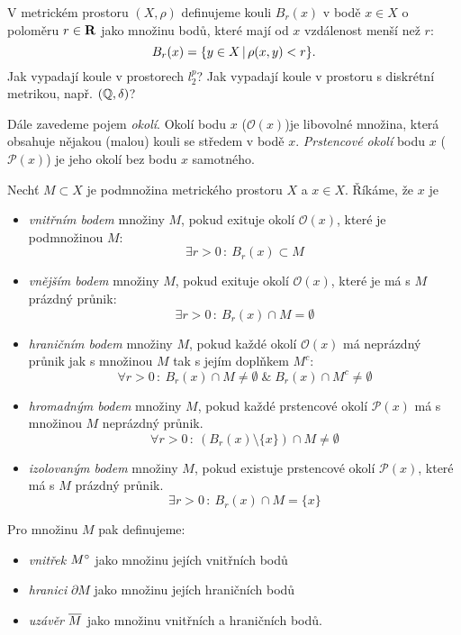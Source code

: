 V metrickém prostoru $(X,\rho)$ definujeme kouli $B_r(x)$ v bodě $x\in X$ o poloměru $r\in{\rm\bf R}$ jako množinu bodů, které mají od
$x$ vzdálenost menší než $r$:
\[
        B_r(x)=\{ y\in X\,|\, \rho(x,y)< r\}.
\]
Jak vypadají koule v prostorech $l^p_2$? Jak vypadají koule v prostoru s diskrétní metrikou, např. $({\mathbb{Q}}, \delta)$?

Dále zavedeme pojem {\it okolí}. Okolí bodu $x$ ($\mathcal O(x)$)je libovolné množina, která obsahuje nějakou (malou) kouli se středem v bodě $x$. {\it Prstencové okolí}
bodu $x$ ($\mathcal P(x)$) je jeho okolí bez bodu $x$ samotného.

Nechť $M\subset X$ je podmnožina metrického prostoru $X$ a $x\in X$.
Říkáme, že $x$ je
\begin{itemize}
   \item {\it vnitřním bodem} množiny $M$, pokud exituje okolí $\mathcal O(x)$, které je podmnožinou $M$:
        \[
          \exists r>0\,:\ B_r(x)\subset M
        \]
   \item {\it vnějším bodem} množiny $M$, pokud exituje okolí $\mathcal O(x)$, které je má s $M$ prázdný průnik:
        \[
          \exists r>0\,:\ B_r(x)\cap M=\emptyset
        \]
   \item {\it hraničním bodem} množiny $M$, pokud každé okolí $\mathcal O(x)$ má neprázdný průnik jak s množinou $M$ tak s jejím doplňkem $M^c$:
        \[
          \forall r>0\,:\ B_r(x)\cap M\neq\emptyset \;\&\; B_r(x)\cap M^c\neq\emptyset
        \]
   \item {\it hromadným bodem} množiny $M$, pokud každé prstencové okolí $\mathcal P(x)$ má s množinou $M$ neprázdný průnik.
        \[         
          \forall r>0\,:\ (B_r(x)\setminus\{x\})\cap M\neq\emptyset
        \]
   \item {\it izolovaným bodem} množiny $M$, pokud existuje prstencové okolí $\mathcal P(x)$, které má s $M$ prázdný průnik.
        \[
         \exists r>0\,:\ B_r(x)\cap M=\{x\}
        \]
\end{itemize}

Pro množinu $M$ pak definujeme:
\begin{itemize}
 \item {\it vnitřek} $M^\circ$ jako množinu jejích vnitřních bodů
 \item {\it hranici} $\partial M$ jako množinu jejích hraničních bodů
 \item {\it uzávěr} $\overline{M}$ jako množinu vnitřních a hraničních bodů. 
\end{itemize}

